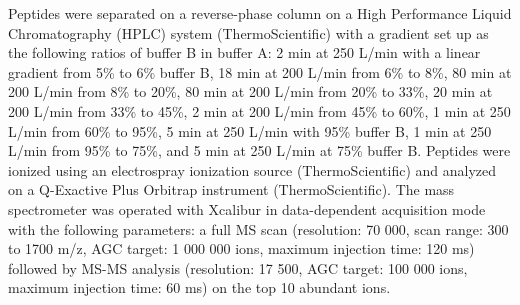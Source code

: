 Peptides were separated on a reverse-phase column on a High Performance Liquid Chromatography (HPLC) system (ThermoScientific) with a gradient set up as the following ratios of buffer B in buffer A: 2 min at 250 {}\textmu L/min with a linear gradient from 5\% to 6\% buffer B, 18 min at 200 {}\textmu L/min from 6\% to 8\%, 80 min at 200 {}\textmu L/min from 8\% to 20\%, 80 min at 200 {}\textmu L/min from 20\% to 33\%, 20 min at 200 {}\textmu L/min from 33\% to 45\%, 2 min at 200 {}\textmu L/min from 45\% to 60\%, 1 min at 250 {}\textmu L/min from 60\% to 95\%, 5 min at 250 {}\textmu L/min with 95\% buffer B, 1 min at 250 {}\textmu L/min from 95\% to 75\%, and 5 min at 250 {}\textmu L/min at 75\% buffer B. Peptides were ionized using an electrospray ionization source (ThermoScientific) and analyzed on a Q-Exactive Plus Orbitrap instrument (ThermoScientific). The mass spectrometer was operated with Xcalibur in data-dependent acquisition mode with the following parameters: a full MS scan (resolution: 70 000, scan range: 300 to 1700 m/z, AGC target: 1 000 000 ions, maximum injection time: 120 ms) followed by MS-MS analysis (resolution: 17 500, AGC target: 100 000 ions, maximum injection time: 60 ms) on the top 10 abundant ions.


